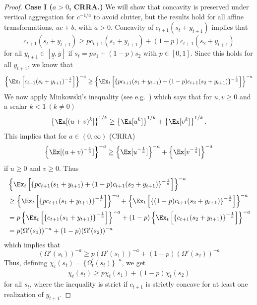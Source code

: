 \documentclass[titlepage]{\econtex}
\begin{document}
\begin{proof}
    \bigskip
    \noindent \textbf{Case I ($a > 0$, CRRA.)} 	We will show that concavity is preserved under vertical aggregation for $c^{-1/a}$ to avoid clutter, but the results hold for all affine transformations, $ac + b$, with $a>0$. Concavity of $c_{t+1}(s_t + {y}_{t+1})$ implies that
    \begin{equation}c_{t+1}(s_t + {y}_{t+1}) \geq pc_{t+1}(s_1 + {y}_{t+1}) + (1-p) c_{t+1}(s_2 + {y}_{t+1}) \label{eq:vert_crra_conc}\end{equation}
    for all ${y}_{t+1} \in [\underline{y},\bar{y}]$ if $s_t = ps_1 + (1-p)s_2$ with $p \in [0,1]$. Since this holds for all ${y}_{t+1}$, we know that
    \[\left\{\Ex_t\left[c_{t+1}(s_t + {y}_{t+1})^{-\frac{1}{a}}\right]\right\}^{-a} \geq \left\{\Ex_t\left[\left\{pc_{t+1}(s_1 + {y}_{t+1}) + (1-p) c_{t+1}(s_2 + {y}_{t+1})\right\}^{-\frac{1}{a}}\right]\right\}^{-a}\]
    We now apply Minkowski's inequality (see e.g.\ \citealp[Theorem 3]{beckenbach1983inequalities}) which says that for $u,v \geq 0$ and a scalar $k < 1\ (k \neq 0)$
    \[\left\{\Ex[(u + v)^{k}]\right\}^{1/k} \geq \left\{\Ex[u^{k}]\right\}^{1/k} + \left\{\Ex[v^{k}]\right\}^{1/k}.\]
    This implies that for $a \in (0,\infty)$ (CRRA)
    \[\left\{\Ex[(u + v)^{-\frac{1}{a}}]\right\}^{-a} \geq \left\{\Ex[u^{-\frac{1}{a}}]\right\}^{-a} + \left\{\Ex[v^{-\frac{1}{a}}]\right\}^{-a}\]
    if $u\geq 0$ and $v\geq 0$. Thus
    \begin{align*}
      &\left\{ \Ex_t \left[\left\{pc_{t+1}(s_1 + {y}_{t+1}) + (1-p) c_{t+1}(s_2 + {y}_{t+1})\right\}^{-\frac{1}{a}}\right]\right\}^{-a} \\ & \geq \left\{ \Ex_t \left[\left\{pc_{t+1}(s_1 + {y}_{t+1})\right\}^{-\frac{1}{a}}\right]\right\}^{-a} + \left\{ \Ex_t \left[\left\{(1-p) c_{t+1}(s_2 + {y}_{t+1})\right\}^{-\frac{1}{a}}\right]\right\}^{-a} \\
      & = p\left\{ \Ex_t \left[\left\{c_{t+1}(s_1 + {y}_{t+1})\right\}^{-\frac{1}{a}}\right]\right\}^{-a} +(1-p) \left\{ \Ex_t \left[\left\{ c_{t+1}(s_2 + {y}_{t+1})\right\}^{-\frac{1}{a}}\right]\right\}^{-a} \\ & = p(\Omega'(s_1))^{-a} + (1-p)(\Omega'(s_2))^{-a}
    \end{align*}
    which implies that 
    \[ (\Omega'(s_t))^{-a} \geq p(\Omega'(s_1))^{-a} + (1-p)(\Omega'(s_2))^{-a}\]	
    Thus, defining
    $\chi_{t}(s_{t}) = \{\Omega_{t}^{'}(s_{t})\}^{-a}$, we get
    \begin{align*}
      \chi_{t}(s_{t}) \geq p \chi_{t}(s_{1}) + (1-p) \chi_{t}(s_{2})
    \end{align*}
    for all $s_{t}$, where the inequality is strict if $c_{t+1}$ is strictly concave for at least one realization of ${y}_{t+1}$.
    

\end{proof}
\end{document}
